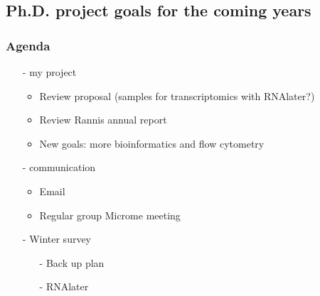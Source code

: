 \subsection{Ph.D. project goals for the coming years}
\label{task:20180131_cj0}

\subsubsection{Agenda}
\begin{enumerate}
    \item[-] my project
    \begin{itemize}
        \item Review proposal (samples for transcriptomics with RNAlater?)
        \item Review Rannis annual report
        \item New goals: more bioinformatics and flow cytometry
    \end{itemize}
    
    \item[-] communication
    \begin{itemize}
        \item Email
        \item Regular group Microme meeting
    \end{itemize}
    \item[-] Winter survey
    \begin{itemize}
        \item[-] Back up plan
        \item[-] RNAlater
    \end{itemize}
\end{enumerate}
